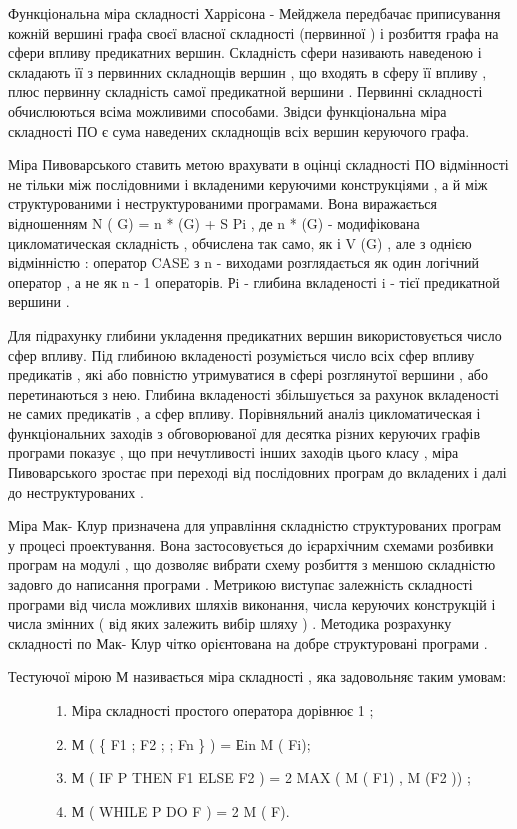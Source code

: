\documentclass[oneside,final,14pt]{extreport}
\begin{document}
Функціональна міра складності Харрісона - Мейджела передбачає приписування кожній вершині графа своєї власної складності (первинної ) і розбиття графа на сфери впливу предикатних вершин. Складність сфери називають наведеною і складають її з первинних складнощів вершин , що входять в сферу її впливу , плюс первинну складність самої предикатной вершини . Первинні складності обчислюються всіма можливими способами. Звідси функціональна міра складності ПО є сума наведених складнощів всіх вершин керуючого графа.

Міра Пивоварського ставить метою врахувати в оцінці складності ПО відмінності не тільки між послідовними і вкладеними керуючими конструкціями , а й між структурованими і неструктурованими програмами. Вона виражається відношенням N ( G) = n * (G) + S Pi , де n * (G) - модифікована цикломатическая складність , обчислена так само, як і V (G) , але з однією відмінністю : оператор CASE з n - виходами розглядається як один логічний оператор , а не як n - 1 операторів. Рi - глибина вкладеності i - тієї предикатной вершини .

Для підрахунку глибини укладення предикатних вершин використовується число сфер впливу. Під глибиною вкладеності розуміється число всіх сфер впливу предикатів , які або повністю утримуватися в сфері розглянутої вершини , або перетинаються з нею. Глибина вкладеності збільшується за рахунок вкладеності не самих предикатів , а сфер впливу. Порівняльний аналіз цикломатическая і функціональних заходів з обговорюваної для десятка різних керуючих графів програми показує , що при нечутливості інших заходів цього класу , міра Пивоварського зростає при переході від послідовних програм до вкладених і далі до неструктурованих .

Міра Мак- Клур призначена для управління складністю структурованих програм у процесі проектування. Вона застосовується до ієрархічним схемами розбивки програм на модулі , що дозволяє вибрати схему розбиття з меншою складністю задовго до написання програми . Метрикою виступає залежність складності програми від числа можливих шляхів виконання, числа керуючих конструкцій і числа змінних ( від яких залежить вибір шляху ) . Методика розрахунку складності по Мак- Клур чітко орієнтована на добре структуровані програми .
\begin{description}
\item[{Тестуючої мірою М називається міра складності , яка задовольняє таким умовам:}] \leavevmode\begin{enumerate}
\item {} 
Міра складності простого оператора дорівнює 1 ;

\item {} 
М ( \{ F1 ; F2 ;  ; Fn \} ) = Еin M ( Fi);

\item {} 
М ( IF P THEN F1 ELSE F2 ) = 2 MAX ( M ( F1) , M (F2 )) ;

\item {} 
М ( WHILE P DO F ) = 2 M ( F).

\end{enumerate}

\end{description}
\end{document}
